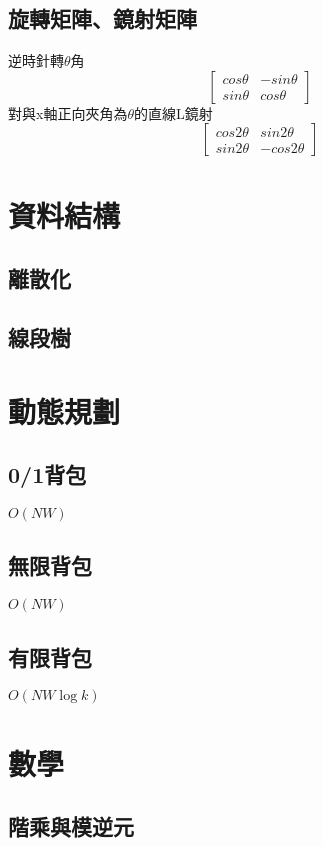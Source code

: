 \documentclass[a4paper,10pt,twocolumn,oneside]{article}
\begin{document}
\subsection{旋轉矩陣、鏡射矩陣}
逆時針轉$\theta$角
\[\begin{bmatrix}
  cos\theta&-sin\theta  \\
  sin\theta &cos\theta 
\end{bmatrix}\]
對與x軸正向夾角為$\theta$的直線L鏡射
\[\begin{bmatrix}
  cos2\theta & sin2\theta  \\
  sin2\theta & -cos2\theta 
\end{bmatrix}\]

\section{資料結構}
\subsection{離散化}

\subsection{線段樹}


\section{動態規劃}
\subsection{0/1背包}
$O(NW)$

\subsection{無限背包}
$O(NW)$

\subsection{有限背包}
$O(NW\log{k})$



\section{數學}
\subsection{階乘與模逆元}

\end{document}
